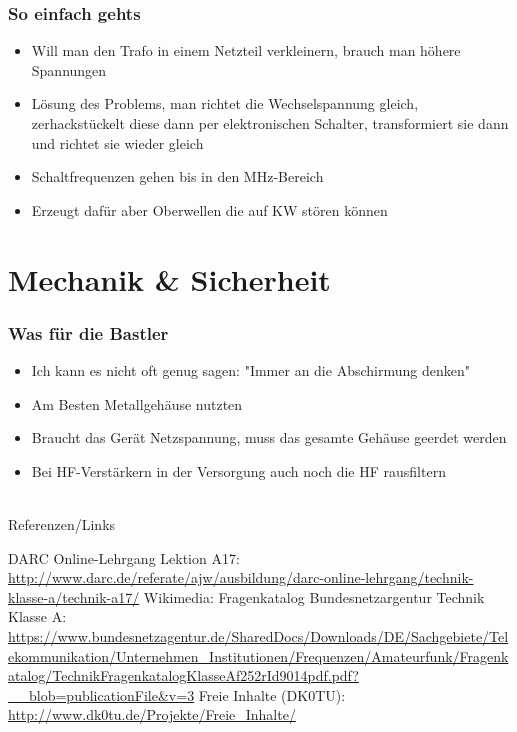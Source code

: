 \begin{frame}
\frametitle{So einfach gehts}
\begin{itemize}
	\item	Will man den Trafo in einem Netzteil verkleinern, brauch man höhere Spannungen
	\item	Lösung des Problems, man richtet die Wechselspannung gleich, zerhackstückelt diese dann per elektronischen Schalter, transformiert sie dann und richtet sie wieder gleich
	\item	Schaltfrequenzen gehen bis in den MHz-Bereich
	\item	Erzeugt dafür aber Oberwellen die auf KW stören können
\end{itemize}
\end{frame}

\section*{Mechanik \& Sicherheit}
\begin{frame}
\frametitle{Was für die Bastler}
\begin{itemize}
	\item	Ich kann es nicht oft genug sagen: "Immer an die Abschirmung denken"
	\item	Am Besten Metallgehäuse nutzten
	\item	Braucht das Gerät Netzspannung, muss das gesamte Gehäuse geerdet werden
	\item	Bei HF-Verstärkern in der Versorgung auch noch die HF rausfiltern
\end{itemize}
\end{frame}

\renewcommand{\refname}{Referenzen}

\hypertarget{refs}{}
\textcolor{white}{} \\ %
\Large Referenzen/Links
\footnotesize

\begin{thebibliography}{}
      DARC Online-Lehrgang Lektion A17:
                    \url{http://www.darc.de/referate/ajw/ausbildung/darc-online-lehrgang/technik-klasse-a/technik-a17/}
     	Wikimedia:
	   Fragenkatalog Bundesnetzargentur Technik Klasse A:                   
                    \url{https://www.bundesnetzagentur.de/SharedDocs/Downloads/DE/Sachgebiete/Telekommunikation/Unternehmen_Institutionen/Frequenzen/Amateurfunk/Fragenkatalog/TechnikFragenkatalogKlasseAf252rId9014pdf.pdf?__blob=publicationFile&v=3}
        Freie Inhalte (DK0TU):
                    \url{http://www.dk0tu.de/Projekte/Freie_Inhalte/}
\end{thebibliography} 


